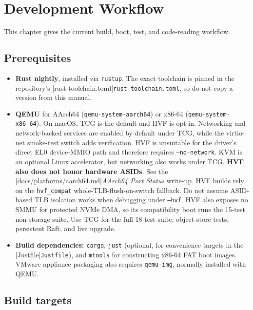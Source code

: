 \chapter{Development Workflow}
\label{chap:development}

This chapter gives the current build, boot, test, and code-reading workflow.

\section{Prerequisites}

\begin{itemize}
    \item \textbf{Rust nightly}, installed via \texttt{rustup}. The exact
        toolchain is pinned in the repository's
        \repofiletext|rust-toolchain.toml|{\texttt{rust-}\allowbreak\texttt{toolchain.toml}}, so
        do not copy a version
        from this manual.
    \item \textbf{QEMU} for AArch64 (\texttt{qemu-system-aarch64}) or x86-64
        (\texttt{qemu-system-x86\_64}). On macOS, TCG is the default and HVF
        is opt-in. Networking and network-backed services are enabled by
        default under TCG, while the virtio-net smoke-test switch adds verification.
        HVF is unsuitable for the driver's direct EL0 device-MMIO path and
        therefore requires \texttt{--no-network}. KVM is an optional Linux
        accelerator, but networking also works under TCG.
        \textbf{HVF also does not honor hardware ASIDs}. See the
        \repofiletext|docs/platforms/aarch64.md|{\emph{AArch64 Port Status}}
        write-up. HVF builds rely on the
        \texttt{hvf\_compat} whole-TLB-flush-on-switch fallback. Do not assume
        ASID-based TLB isolation works when debugging under \texttt{--hvf}.
        HVF also exposes no SMMU for protected NVMe DMA, so its compatibility
        boot runs the 15-test non-storage suite. Use TCG for the full 18-test
        suite, object-store tests, persistent Raft, and live upgrade.
    \item \textbf{Build dependencies:} \texttt{cargo}, \texttt{just} (optional,
        for convenience targets in the
        \repofiletext|Justfile|{\texttt{Justfile}}), and \texttt{mtools} for
        constructing x86-64 FAT boot images. VMware appliance packaging also
        requires \texttt{qemu-img}, normally installed with QEMU.
\end{itemize}

\section{Build targets}

